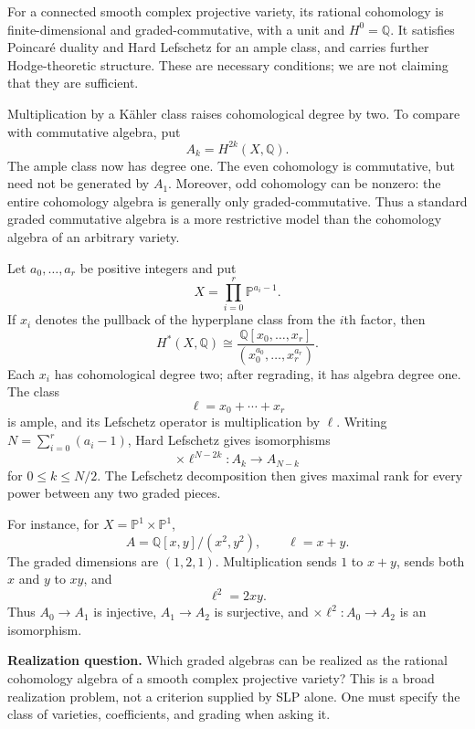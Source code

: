 For a connected smooth complex projective
variety, its rational cohomology is
finite-dimensional and graded-commutative,
with a unit and $H^0=\mathbb{Q}$.
It satisfies Poincaré duality and Hard
Lefschetz for an ample class, and carries
further Hodge-theoretic structure.
These are necessary conditions; we are not
claiming that they are sufficient.

\begin{remark}
\label{remark-grading}
Multiplication by a Kähler class raises
cohomological degree by two.
To compare with commutative algebra, put
$$
A_k=H^{2k}(X,\mathbb{Q}).
$$
The ample class now has degree one.
The even cohomology is commutative, but
need not be generated by $A_1$.
Moreover, odd cohomology can be nonzero:
the entire cohomology algebra is generally
only graded-commutative.
Thus a standard graded commutative algebra
is a more restrictive model than the
cohomology algebra of an arbitrary variety.
\end{remark}

\begin{example}
\label{example-projective-products}
Let $a_0,\ldots,a_r$ be positive integers
and put
$$
X=\prod_{i=0}^{r}\mathbb{P}^{a_i-1}.
$$
If $x_i$ denotes the pullback of the
hyperplane class from the $i$th factor,
then
$$
H^*(X,\mathbb{Q})\cong
\frac{\mathbb{Q}[x_0,\ldots,x_r]}
{(x_0^{a_0},\ldots,x_r^{a_r})}.
$$
Each $x_i$ has cohomological degree two;
after regrading, it has algebra degree one.
The class
$$
\ell=x_0+\cdots+x_r
$$
is ample, and its Lefschetz operator is
multiplication by $\ell$.
Writing $N=\sum_{i=0}^{r}(a_i-1)$, Hard
Lefschetz gives isomorphisms
$$
\times\ell^{N-2k}:A_k\longrightarrow A_{N-k}
$$
for $0\leq k\leq N/2$.
The Lefschetz decomposition then gives
maximal rank for every power between any
two graded pieces.
\end{example}

For instance, for
$X=\mathbb{P}^1\times\mathbb{P}^1$,
$$
A=\mathbb{Q}[x,y]/(x^2,y^2),
\qquad \ell=x+y.
$$
The graded dimensions are $(1,2,1)$.
Multiplication sends $1$ to $x+y$,
sends both $x$ and $y$ to $xy$, and
$$
\ell^2=2xy.
$$
Thus $A_0\longrightarrow A_1$ is
injective, $A_1\longrightarrow A_2$ is
surjective, and
$\times\ell^2:A_0\longrightarrow A_2$
is an isomorphism.

\medskip\noindent
\textbf{Realization question.}
Which graded algebras can be realized as
the rational cohomology algebra of a
smooth complex projective variety?
This is a broad realization problem,
not a criterion supplied by SLP alone.
One must specify the class of varieties,
coefficients, and grading when asking it.

